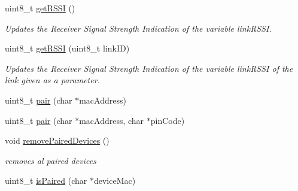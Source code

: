 \begin{DoxyCompactItemize}
uint8\+\_\+t \hyperlink{class_wasp_b_t___pro_ac72a4214a289c89a4deeb2670b1a9036}{get\+R\+S\+SI} ()
\begin{DoxyCompactList}\small\item\em Updates the Receiver Signal Strength Indication of the variable link\+R\+S\+SI. \end{DoxyCompactList}\item 
uint8\+\_\+t \hyperlink{class_wasp_b_t___pro_a7d8347e8d02c60304f34b5d7024887da}{get\+R\+S\+SI} (uint8\+\_\+t link\+ID)
\begin{DoxyCompactList}\small\item\em Updates the Receiver Signal Strength Indication of the variable link\+R\+S\+SI of the link given as a parameter. \end{DoxyCompactList}\item 
uint8\+\_\+t \hyperlink{class_wasp_b_t___pro_ab8ed7f1e628d84c635a301d049b98d37}{pair} (char $\ast$mac\+Address)
\item 
uint8\+\_\+t \hyperlink{class_wasp_b_t___pro_a2da5c037e4206213881c68888f3d9629}{pair} (char $\ast$mac\+Address, char $\ast$pin\+Code)
\item 
void \hyperlink{class_wasp_b_t___pro_a2281e52754f6adbce8b2bf93dcae574b}{remove\+Paired\+Devices} ()
\begin{DoxyCompactList}\small\item\em removes al paired devices \end{DoxyCompactList}\item 
uint8\+\_\+t \hyperlink{class_wasp_b_t___pro_a3e127aedbb5989d50a428054ed5ed952}{is\+Paired} (char $\ast$device\+Mac)
\end{DoxyCompactItemize}
